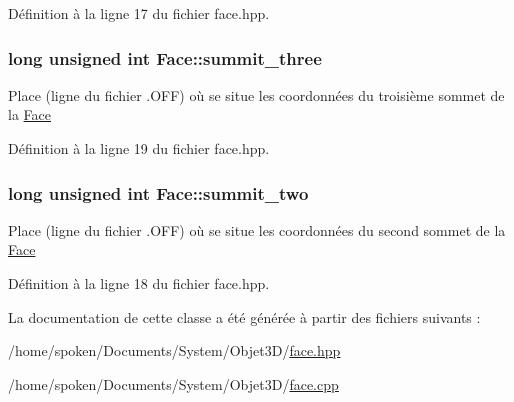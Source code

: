 Définition à la ligne 17 du fichier face.\-hpp.

\hypertarget{class_face_ad10219db49c55f03d38533424bfa1c0c}{
\subsubsection[{summit\-\_\-three}]{\setlength{\rightskip}{0pt plus 5cm}long unsigned int Face\-::summit\-\_\-three\hspace{0.3cm}{\ttfamily [private]}}}\label{class_face_ad10219db49c55f03d38533424bfa1c0c}
Place (ligne du fichier .O\-F\-F) où se situe les coordonnées du troisième sommet de la \hyperlink{class_face}{Face} 

Définition à la ligne 19 du fichier face.\-hpp.

\hypertarget{class_face_aa46034f67b74525862dda3452dab6f89}{
\subsubsection[{summit\-\_\-two}]{\setlength{\rightskip}{0pt plus 5cm}long unsigned int Face\-::summit\-\_\-two\hspace{0.3cm}{\ttfamily [private]}}}\label{class_face_aa46034f67b74525862dda3452dab6f89}
Place (ligne du fichier .O\-F\-F) où se situe les coordonnées du second sommet de la \hyperlink{class_face}{Face} 

Définition à la ligne 18 du fichier face.\-hpp.



La documentation de cette classe a été générée à partir des fichiers suivants \-:\begin{DoxyCompactItemize}
\item 
/home/spoken/\-Documents/\-System/\-Objet3\-D/\hyperlink{face_8hpp}{face.\-hpp}\item 
/home/spoken/\-Documents/\-System/\-Objet3\-D/\hyperlink{face_8cpp}{face.\-cpp}\end{DoxyCompactItemize}
